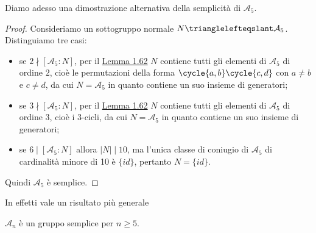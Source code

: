 \documentclass[11pt]{scrartcl}
\begin{document}
Diamo adesso una dimostrazione alternativa della semplicità di $\mathcal{A}_5$.

\begin{proof}
    Consideriamo un sottogruppo normale $N\trianglelefteqslant \mathcal{A}_5$.
    Distinguiamo tre casi:
    \begin{itemize}
        \item se $2 \nmid [\mathcal{A}_5:N]$, per il \hyperref[lemma1.62]{Lemma 1.62}
        $N$ contiene tutti gli elementi di 
        $\mathcal{A}_5$ di ordine $2$, cioè le permutazioni della forma $\cycle{a, b}\cycle{c, d}$
        con $a\neq b$ e $c \neq d$, da cui $N = \mathcal{A}_5$ in quanto contiene 
        un suo insieme di generatori;
        \item se $3\nmid [\mathcal{A}_5:N]$, per il \hyperref[lemma1.62]{Lemma 1.62}
        $N$ contiene tutti gli elementi di 
        $\mathcal{A}_5$ di ordine 3, cioè i 3-cicli, da cui $N = \mathcal{A}_5$
        in quanto contiene un suo insieme di generatori;
        \item se $6 \mid [\mathcal{A}_5:N]$ allora $|N| \mid 10$, ma l'unica
        classe di coniugio di $\mathcal{A}_5$ di cardinalità minore di 10 è
        $\{id\}$, pertanto $N = \{id\}$.
    \end{itemize}
    Quindi $\mathcal{A}_5$ è semplice.
\end{proof}

In effetti vale un risultato più generale

\begin{proposition}
    $\mathcal{A}_n$ è un gruppo semplice per $n \geq 5$.
\end{proposition}
\end{document}
